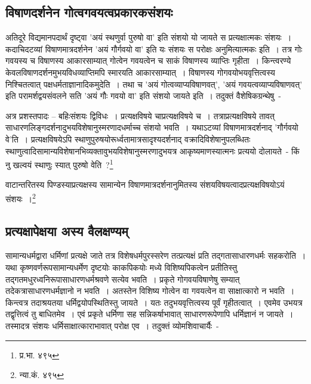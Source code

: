 		\subsection{विषाणदर्शनेन गोत्वगवयत्वप्रकारकसंशयः}

		अतिदूरे विद्यमानपदार्थं दृष्ट्वा 'अयं स्थणुर्वा पुरुषो वा' इति संशयो यो जायते स प्रत्यक्षात्मकः संशयः~। कदाचिदटव्यां विषाणमात्रदर्शनेन 'अयं गौर्गवयो वा' इति यः संशयः स परोक्षः अनुमित्यात्मकः इति~। तत्र गोः गवयस्य च विषाणस्य आकारसाम्यात् गोत्वेन गवयत्वेन च साकं विषाणस्य व्याप्तिः गृहीता~। किन्त्वरण्ये केवलविषाणदर्शनमुभयविधव्याप्तिमपि स्मारयति आकारसाम्यात्~। विषाणस्य गोगवयोभयवृत्तित्वस्य निश्चितत्वात् पक्षधर्मताज्ञानादिकमुदेति~। तथा च 'अयं गोत्वव्याप्यविषाणवत्', 'अयं गवयत्वव्याप्यविषाणवत्' इति परामर्शद्वयसंवलने सति 'अयं गौः गवयो वा' इति संशयो जायते इति~। तदुक्तं वैशेषिकग्रन्थेषु~-

		{\fontsize{11.7}{0}\selectfont\s अत्र प्रशस्तपादः – बहिःसंशयः द्विविधः~। प्रत्यक्षविषये चाप्रत्यक्षविषये च~। तत्राप्रत्यक्षविषये तावत् साधारणलिङ्गदर्शनादुभयविशेषानुस्मरणादधर्माच्च संशयो भवति~। यथाऽटव्यां विषाणमात्रदर्शनाद् 'गौर्गवयो वे'ति~। प्रत्यक्षविषयेऽपि स्थाणुपुरुषयोरूर्ध्वतामात्रसादृश्यदर्शनाद् वक्रादिविशेषानुपलब्धितः स्थाणुत्वादिसामान्यविशेषानभिव्यक्तावुभयविशेषानुस्मरणादुभयत्र आकृष्यमाणस्यात्मनः प्रत्ययो दोलायते~-  किं नु खल्वयं स्थाणुः स्यात् पुरुषो वेति~?\footnote{प्र.भा. ४९५}}

		{\fontsize{11.7}{0}\selectfont\s वाटान्तरितस्य  पिण्डस्याप्रत्यक्षस्य सामान्येन विषाणमात्रदर्शनानुमितस्य संशयविषयत्वादप्रत्यक्षविषयोऽयं संशयः~।\footnote{न्या.कं. ४९५}}

		\subsection{प्रत्यक्षापेक्षया अस्य वैलक्षण्यम्}

		सामान्यधर्मद्वारा धर्मिणां प्रत्यक्षे जाते तत्र विशेषधर्मपुरस्सरेण तत्प्रत्यक्षं प्रति तद्गतासाधारणधर्मः सहकरोति~। यथा कृष्णवर्णरूपसामान्यधर्मेण दृष्टयोः काकपिकयोः मध्ये विशिष्यपिकत्वेन प्रतीतिस्तु तद्गतमधुरध्वनिरूपासाधारणधर्मश्रवणे सत्येव भवति~। प्रकृते गोगवयविषाणेषु सम्यात् तदेकत्रासाधारणधर्मज्ञानो न भवति~। अतस्तेन विशिष्य गोत्वेन वा गवयत्वेन वा साक्षात्कारो न भवति~। किन्त्वत्र तदाश्रयतया धर्मिद्वयोपस्थितिस्तु जायते~। यतः तदुभयवृत्तित्वस्य पूर्वं गृहीतत्वात्~। एवमेव उभयत्र तद्वृत्तित्वं तु बाधितमेव~। एवं प्रकृते धर्मिणा सह सन्निकर्षाभावात् साधारणरूपेणापि धर्मिज्ञानं न जायते~। तस्मादत्र संशयः धर्मिसाक्षात्काराभावात् परोक्ष एव~। तदुक्तं व्योमशिवाचार्यैः~-


